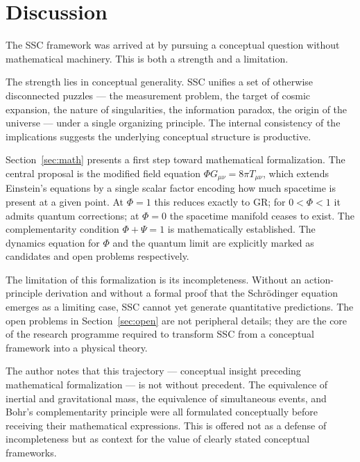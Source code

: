 \documentclass[12pt,a4paper]{article}
\begin{document}
\section{Discussion}
\label{sec:discussion}

The SSC framework was arrived at by pursuing a conceptual question
without mathematical machinery.  This is both a strength and a
limitation.

The strength lies in conceptual generality.  SSC unifies a set of
otherwise disconnected puzzles — the measurement problem, the target of
cosmic expansion, the nature of singularities, the information paradox,
the origin of the universe — under a single organizing principle.  The
internal consistency of the implications suggests the underlying
conceptual structure is productive.

Section~\ref{sec:math} presents a first step toward mathematical
formalization.  The central proposal is the modified field equation
$\Phi G_{\mu\nu} = 8\pi T_{\mu\nu}$, which extends Einstein's equations
by a single scalar factor encoding how much spacetime is present at a
given point.  At $\Phi = 1$ this reduces exactly to GR; for
$0 < \Phi < 1$ it admits quantum corrections; at $\Phi = 0$ the
spacetime manifold ceases to exist.  The complementarity condition
$\Phi + \Psi = 1$ is mathematically established.  The dynamics equation
for $\Phi$ and the quantum limit are explicitly marked as candidates
and open problems respectively.

The limitation of this formalization is its incompleteness.  Without
an action-principle derivation and without a formal proof that the
Schrödinger equation emerges as a limiting case, SSC cannot yet generate
quantitative predictions.  The open problems in
Section~\ref{sec:open} are not peripheral details; they are the core
of the research programme required to transform SSC from a conceptual
framework into a physical theory.

The author notes that this trajectory — conceptual insight preceding
mathematical formalization — is not without precedent.  The equivalence
of inertial and gravitational mass, the equivalence of simultaneous
events, and Bohr's complementarity principle were all formulated
conceptually before receiving their mathematical expressions.  This is
offered not as a defense of incompleteness but as context for the
value of clearly stated conceptual frameworks.
\end{document}
